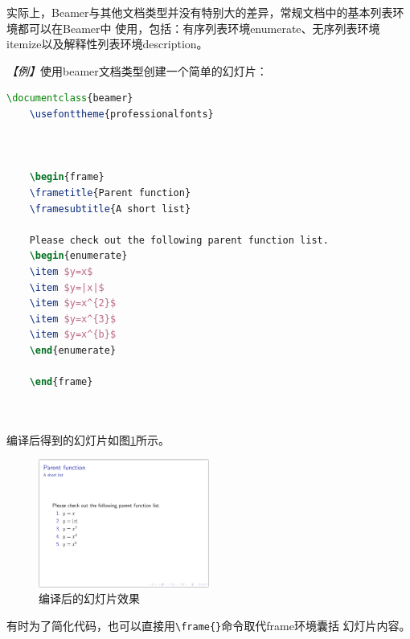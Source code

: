 实际上，Beamer与其他文档类型并没有特别大的差异，常规文档中的基本列表环境都可以在Beamer中
使用，包括：有序列表环境enumerate、无序列表环境itemize以及解释性列表环境description。

\emph{【例】}使用beamer文档类型创建一个简单的幻灯片：
\begin{lstlisting}[language=TeX]
    \documentclass{beamer}
    \usefonttheme{professionalfonts}

    

    \begin{frame}
    \frametitle{Parent function}
    \framesubtitle{A short list}

    Please check out the following parent function list.
    \begin{enumerate}
    \item $y=x$
    \item $y=|x|$
    \item $y=x^{2}$
    \item $y=x^{3}$
    \item $y=x^{b}$
    \end{enumerate}

    \end{frame}

    
\end{lstlisting}

编译后得到的幻灯片如图\ref{fig:903}所示。

\begin{figure}[htbp]
    \centering
    \includegraphics[width = 0.5\textwidth]{images/ch_9/example3.png}
    \caption{编译后的幻灯片效果}
    \label{fig:903}
\end{figure}

有时为了简化代码，也可以直接用\texttt{\textbackslash{}frame\{\}}命令取代frame环境囊括
幻灯片内容。

